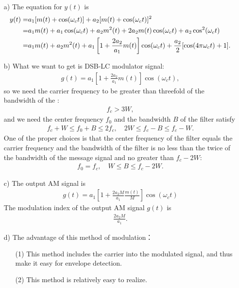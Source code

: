 \documentclass{assignment}
\begin{document}
\begin{sol}
    \begin{itemize}
        \item[a)] The equation for $y(t)$ is
        \begin{align}
            \notag y(t)=&a_1[m(t)+\cos(\omega_ct)]+a_2[m(t)+\cos(\omega_ct)]^2\\
            \notag=&a_1m(t)+a_1\cos(\omega_ct)+a_2m^2(t)+2a_2m(t)\cos(\omega_ct)+a_2\cos^2(\omega_ct)\\
            =&a_1m(t)+a_2m^2(t)+a_1\left[1+\frac{2a_2}{a_1}m(t)\right]\cos(\omega_ct)+\frac{a_2}{2}[\cos(4\pi\omega_ct)+1].
        \end{align}
        \item[b)] What we want to get is DSB-LC modulator signal:
        \begin{align}
            g(t)=a_1\left[1+\frac{2a_2}{a_1}m(t)\right]\cos(\omega_ct),
        \end{align}
        so we need the carrier frequency to be greater than threefold of the bandwidth of the :
        \begin{align}
            f_c>3W,
        \end{align}
        and we need the center frequency $f_0$ and the bandwidth $B$ of the filter satisfy
        \begin{align}
            f_c+W\leq f_0+B\leq 2f_c,\quad 2W\leq f_c-B\leq f_c-W.
        \end{align}
        One of the proper choices is that the center frequency of the filter equals the carrier frequency and the bandwidth of the filter is no less than the twice of the bandwidth of the message signal and no greater than $f_c-2W$:
        \begin{align}
            f_0=f_c,\quad W\leq B\leq f_c-2W.
        \end{align}
        \item[c)] The output AM signal is
        \begin{align}
            g(t)=a_1\left[1+\frac{2a_2M}{a_1}\frac{m(t)}{M}\right]\cos(\omega_ct)
        \end{align}
        The modulation index of the output AM signal $g(t)$ is
        \begin{align}
            \frac{2a_2M}{a_1}.
        \end{align}
        \item[d)] The advantage of this method of modulation：
        \begin{itemize}
            \item[(1)] This method includes the carrier into the modulated signal, and thus make it easy for envelope detection.
            \item[(2)] This method is relatively easy to realize.
        \end{itemize}
    \end{itemize}
\end{sol}
\end{document}
